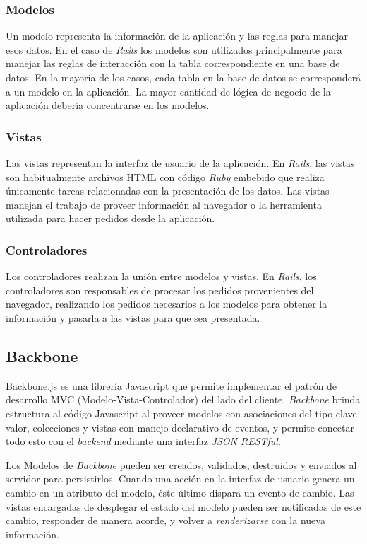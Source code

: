 \subsubsection{Modelos}
Un modelo representa la información de la aplicación y las reglas para manejar esos datos. En el caso de \emph{Rails} los modelos son utilizados principalmente para manejar las reglas de interacción con la tabla correspondiente en una base de datos. En la mayoría de los casos, cada tabla en la base de datos se corresponderá a un modelo en la aplicación. La mayor cantidad de lógica de negocio de la aplicación debería concentrarse en los modelos.
\subsubsection{Vistas}
Las vistas representan la interfaz de usuario de la aplicación. En \emph{Rails}, las vistas son habitualmente archivos HTML con código \emph{Ruby} embebido que realiza únicamente tareas relacionadas con la presentación de los datos. Las vistas manejan el trabajo de proveer información al navegador o la herramienta utilizada para hacer pedidos desde la aplicación.
\subsubsection{Controladores}
Los controladores realizan la unión entre modelos y vistas. En \emph{Rails}, los controladores son responsables de procesar los pedidos provenientes del navegador, realizando los pedidos necesarios a los modelos para obtener la información y pasarla a las vistas para que sea presentada.

\subsection{Backbone}

Backbone.js \cite{backbone} es una librería Javascript que permite implementar el patrón de desarrollo MVC (Modelo-Vista-Controlador) del lado del cliente. \emph{Backbone} brinda estructura al 
código Javascript al proveer modelos con asociaciones del tipo clave-valor, colecciones y vistas con manejo declarativo de eventos, y permite conectar todo esto con el 
\emph{backend} mediante una interfaz \emph{JSON RESTful}.

Los Modelos de \emph{Backbone} pueden ser creados, validados, destruidos y enviados al servidor para persistirlos. Cuando una acción en la interfaz de 
usuario genera un cambio en un atributo del modelo,  éste último dispara un evento de cambio.  Las vistas encargadas de desplegar el estado del modelo pueden ser notificadas de 
este cambio, responder de manera acorde, y volver a \emph{renderizarse} con la nueva información.



\begin{comment}
\section{Buenas prácticas}
En estas secciones se presentan buenas prácticas para el trabajo con javascript, css y el mejor aprovechamiento del cache del protocolo HTTP.



\end{comment}

